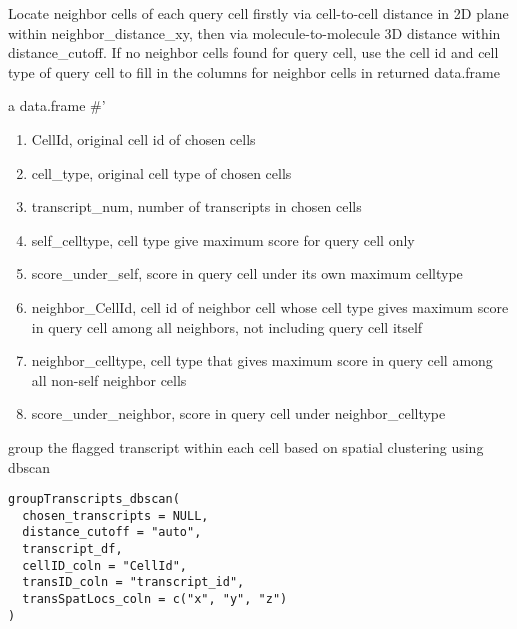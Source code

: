 \documentclass[letterpaper]{book}
\begin{document}
%
\begin{Details}
Locate neighbor cells of each query cell firstly via cell-to-cell distance in 2D plane within neighbor\_distance\_xy, then via molecule-to-molecule 3D distance within distance\_cutoff. If no neighbor cells found for query cell, use the cell id and cell type of query cell to fill in the columns for neighbor cells in returned data.frame
\end{Details}
%
\begin{Value}
a data.frame
\#' \begin{enumerate}

\item{} CellId, original cell id of chosen cells
\item{} cell\_type, original cell type of chosen cells
\item{} transcript\_num, number of transcripts in chosen cells
\item{} self\_celltype, cell type give maximum score for query cell only
\item{} score\_under\_self, score in query cell under its own maximum celltype
\item{} neighbor\_CellId, cell id of neighbor cell whose cell type gives maximum score in query cell among all neighbors, not including query cell itself
\item{} neighbor\_celltype, cell type that gives maximum score in query cell among all non-self neighbor cells
\item{} score\_under\_neighbor, score in query cell under neighbor\_celltype

\end{enumerate}

\end{Value}
%
\begin{Description}
group the flagged transcript within each cell based on spatial clustering using dbscan
\end{Description}
%
\begin{Usage}
\begin{verbatim}
groupTranscripts_dbscan(
  chosen_transcripts = NULL,
  distance_cutoff = "auto",
  transcript_df,
  cellID_coln = "CellId",
  transID_coln = "transcript_id",
  transSpatLocs_coln = c("x", "y", "z")
)
\end{verbatim}
\end{Usage}
%
\end{document}

